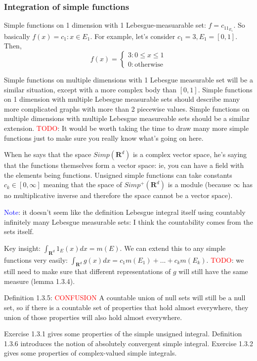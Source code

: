 \documentclass[answers,12pt]{exam}
\begin{document}
\subsubsection{Integration of simple functions}
Simple functions on 1 dimension with 1 Lebesgue-measuarable set: $f=c_11_{E_1}$.
So basically $f(x) = c_1: x \in E_1$.
For example, let's consider $c_1 =3, E_1 = [0,1]$.
Then, \[f(x) = \begin{cases}
    3: 0 \leq x \leq 1 \\
    0: \text{otherwise}
\end{cases}\]

Simple functions on multiple dimensions with 1 Lebesgue measurable set will be a similar situation, except with a more complex body than $[0,1]$.
Simple functions on 1 dimension with multiple Lebesgue measurable sets should describe many more complicated graphs with more than 2 piecewise values.
Simple functions on multiple dimensions with multiple Lebesgue measureable sets should be a similar extension.
\textcolor{red}{TODO}: It would be worth taking the time to draw many more simple functions just to make sure you really know what's going on here.

When he says that the space $Simp(\mathbf{R}^d)$ is a complex vector space, he's saying that the functions themselves form a vector space: ie, you can have a field with the elements being functions.
Unsigned simple functions can take constants $c_k \in [0, \infty]$ meaning that the space of $Simp^{+}(\mathbf{R}^d)$ is a module (because $\infty$ has no multiplicative inverse and therefore the space cannot be a vector space).

\textcolor{blue}{Note}: it doesn't seem like the definition Lebesgue integral itself using countably infinitely many Lebesgue measurable sets: I think the countability comes from the sets itself.

Key insight: $\int_{\mathbf{R}^d}1_E(x)dx = m(E)$.
We can extend this to any simple functions very easily: $\int_{\mathbf{R}^d} g(x) dx = c_1 m(E_1) + ... + c_k m(E_k)$.
\textcolor{red}{TODO}: we still need to make sure that different representations of $g$ will still have the same measure (lemma 1.3.4).

Definition 1.3.5: 
\textcolor{red}{CONFUSION} A countable union of null sets will still be a null set, so if there is a countable set of properties that hold almost everywhere, they union of those properties will also hold almost everywhere.

Exercise 1.3.1 gives some properties of the simple unsigned integral.
Definition 1.3.6 introduces the notion of absolutely convergent simple integral.
Exercise 1.3.2 gives some properties of complex-valued simple integrals.
\end{document}
